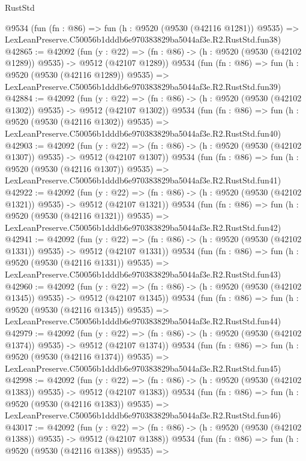 \begin{lexlean}{RustStd}
\begin{coremodule}
    @9534
    (fun (fn : @86) =>
    fun (h : @9520 (@9530 (@42116 @1281)) @9535) =>
    LexLeanPreserve.C50056b1dddb6e970383829ba5044af3e.R2.RustStd.fun38)
@42865 := @42092
    (fun (y : @22) =>
    (fn : @86) -> (h : @9520 (@9530 (@42102 @1289)) @9535) -> @9512 (@42107 @1289))
    @9534
    (fun (fn : @86) =>
    fun (h : @9520 (@9530 (@42116 @1289)) @9535) =>
    LexLeanPreserve.C50056b1dddb6e970383829ba5044af3e.R2.RustStd.fun39)
@42884 := @42092
    (fun (y : @22) =>
    (fn : @86) -> (h : @9520 (@9530 (@42102 @1302)) @9535) -> @9512 (@42107 @1302))
    @9534
    (fun (fn : @86) =>
    fun (h : @9520 (@9530 (@42116 @1302)) @9535) =>
    LexLeanPreserve.C50056b1dddb6e970383829ba5044af3e.R2.RustStd.fun40)
@42903 := @42092
    (fun (y : @22) =>
    (fn : @86) -> (h : @9520 (@9530 (@42102 @1307)) @9535) -> @9512 (@42107 @1307))
    @9534
    (fun (fn : @86) =>
    fun (h : @9520 (@9530 (@42116 @1307)) @9535) =>
    LexLeanPreserve.C50056b1dddb6e970383829ba5044af3e.R2.RustStd.fun41)
@42922 := @42092
    (fun (y : @22) =>
    (fn : @86) -> (h : @9520 (@9530 (@42102 @1321)) @9535) -> @9512 (@42107 @1321))
    @9534
    (fun (fn : @86) =>
    fun (h : @9520 (@9530 (@42116 @1321)) @9535) =>
    LexLeanPreserve.C50056b1dddb6e970383829ba5044af3e.R2.RustStd.fun42)
@42941 := @42092
    (fun (y : @22) =>
    (fn : @86) -> (h : @9520 (@9530 (@42102 @1331)) @9535) -> @9512 (@42107 @1331))
    @9534
    (fun (fn : @86) =>
    fun (h : @9520 (@9530 (@42116 @1331)) @9535) =>
    LexLeanPreserve.C50056b1dddb6e970383829ba5044af3e.R2.RustStd.fun43)
@42960 := @42092
    (fun (y : @22) =>
    (fn : @86) -> (h : @9520 (@9530 (@42102 @1345)) @9535) -> @9512 (@42107 @1345))
    @9534
    (fun (fn : @86) =>
    fun (h : @9520 (@9530 (@42116 @1345)) @9535) =>
    LexLeanPreserve.C50056b1dddb6e970383829ba5044af3e.R2.RustStd.fun44)
@42979 := @42092
    (fun (y : @22) =>
    (fn : @86) -> (h : @9520 (@9530 (@42102 @1374)) @9535) -> @9512 (@42107 @1374))
    @9534
    (fun (fn : @86) =>
    fun (h : @9520 (@9530 (@42116 @1374)) @9535) =>
    LexLeanPreserve.C50056b1dddb6e970383829ba5044af3e.R2.RustStd.fun45)
@42998 := @42092
    (fun (y : @22) =>
    (fn : @86) -> (h : @9520 (@9530 (@42102 @1383)) @9535) -> @9512 (@42107 @1383))
    @9534
    (fun (fn : @86) =>
    fun (h : @9520 (@9530 (@42116 @1383)) @9535) =>
    LexLeanPreserve.C50056b1dddb6e970383829ba5044af3e.R2.RustStd.fun46)
@43017 := @42092
    (fun (y : @22) =>
    (fn : @86) -> (h : @9520 (@9530 (@42102 @1388)) @9535) -> @9512 (@42107 @1388))
    @9534
    (fun (fn : @86) =>
    fun (h : @9520 (@9530 (@42116 @1388)) @9535) =>

\end{coremodule}
\end{lexlean}
